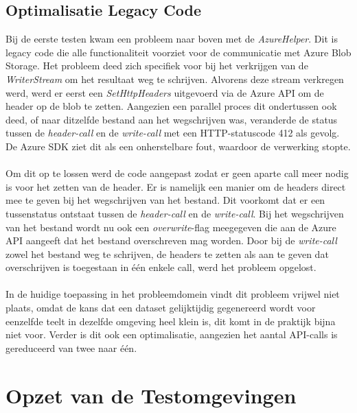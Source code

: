 \subsection{Optimalisatie Legacy Code}

Bij de eerste testen kwam een probleem naar boven met de \textit{AzureHelper}. Dit is legacy code die alle functionaliteit voorziet voor de communicatie met Azure Blob Storage. Het probleem deed zich specifiek voor bij het verkrijgen van de \textit{WriterStream} om het resultaat weg te schrijven. Alvorens deze stream verkregen werd, werd er eerst een \textit{SetHttpHeaders} uitgevoerd via de Azure API om de header op de blob te zetten. Aangezien een parallel proces dit ondertussen ook deed, of naar ditzelfde bestand aan het wegschrijven was, veranderde de status tussen de \textit{header-call} en de \textit{write-call} met een HTTP-statuscode 412 als gevolg. De Azure SDK ziet dit als een onherstelbare fout, waardoor de verwerking stopte.
\\ \\
Om dit op te lossen werd de code aangepast zodat er geen aparte call meer nodig is voor het zetten van de header. Er is namelijk een manier om de headers direct mee te geven bij het wegschrijven van het bestand. Dit voorkomt dat er een tussenstatus ontstaat tussen de \textit{header-call} en de \textit{write-call}. Bij het wegschrijven van het bestand wordt nu ook een \textit{overwrite}-flag meegegeven die aan de Azure API aangeeft dat het bestand overschreven mag worden. Door bij de \textit{write-call} zowel het bestand weg te schrijven, de headers te zetten als aan te geven dat overschrijven is toegestaan in één enkele call, werd het probleem opgelost.
\\ \\
In de huidige toepassing in het probleemdomein vindt dit probleem vrijwel niet plaats, omdat de kans dat een dataset gelijktijdig gegenereerd wordt voor eenzelfde teelt in dezelfde omgeving heel klein is, dit komt in de praktijk bijna niet voor. Verder is dit ook een optimalisatie, aangezien het aantal API-calls is gereduceerd van twee naar één.

\section{Opzet van de Testomgevingen} %

